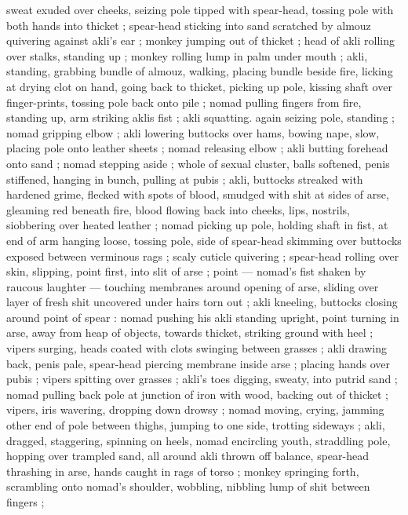 sweat exuded over cheeks, seizing pole tipped with spear-head, 
tossing pole with both hands into thicket ; spear-head sticking into 
sand scratched by almouz quivering against akli's ear ; monkey 
jumping out of thicket ; head of akli rolling over stalks, standing up 
; monkey rolling lump in palm under mouth ; akli, standing, grabbing 
bundle of almouz, walking, placing bundle beside fire, licking at 
drying clot on hand, going back to thicket, picking up pole, kissing 
shaft over finger-prints, tossing pole back onto pile ; nomad pulling 
fingers from fire, standing up, arm striking aklis fist ; akli squatting. 
again seizing pole, standing ; nomad gripping elbow ; akli lowering 
buttocks over hams, bowing nape, slow, placing pole onto leather 
sheets ; nomad releasing elbow ; akli butting forehead onto sand ; 
nomad stepping aside ; whole of sexual cluster, balls softened, penis 
stiffened, hanging in bunch, pulling at pubis ; akli, buttocks streaked 
with hardened grime, flecked with spots of blood, smudged with shit 
at sides of arse, gleaming red beneath fire, blood flowing back into 
cheeks, lips, nostrils, siobbering over heated leather ; nomad picking 
up pole, holding shaft in fist, at end of arm hanging loose, tossing 
pole, side of spear-head skimming over buttocks exposed between 
verminous rags ; scaly cuticle quivering ; spear-head rolling over 
skin, slipping, point first, into slit of arse ; point --- nomad's fist 
shaken by raucous laughter --- touching membranes around opening 
of arse, sliding over layer of fresh shit uncovered under hairs torn 
out ; akli kneeling, buttocks closing around point of spear : nomad 
pushing his akli standing upright, point turning in arse, away from 
heap of objects, towards thicket, striking ground with heel ; vipers 
surging, heads coated with clots swinging between grasses ; akli 
drawing back, penis pale, spear-head piercing membrane inside arse 
; placing hands over pubis ; vipers spitting over grasses ; akli's toes 
digging, sweaty, into putrid sand ; nomad pulling back pole at 
junction of iron with wood, backing out of thicket ; vipers, iris 
wavering, dropping down drowsy ; nomad moving, crying, jamming 
other end of pole between thighs, jumping to one side, trotting 
sideways ; akli, dragged, staggering, spinning on heels, nomad 
encircling youth, straddling pole, hopping over trampled sand, all 
around akli thrown off balance, spear-head thrashing in arse, hands 
caught in rags of torso ; monkey springing forth, scrambling onto 
nomad's shoulder, wobbling, nibbling lump of shit between fingers ; 
